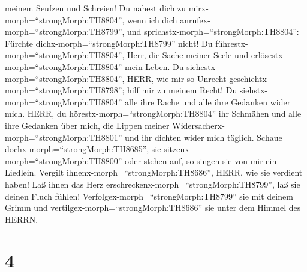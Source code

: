 meinem Seufzen und Schreien!  Du nahest dich zu
mirx-morph=``strongMorph:TH8804'', wenn ich dich
anrufex-morph=``strongMorph:TH8799'', und
sprichstx-morph=``strongMorph:TH8804'': Fürchte
dichx-morph=``strongMorph:TH8799'' nicht!  Du
führestx-morph=``strongMorph:TH8804'', Herr, die Sache meiner Seele und
erlösestx-morph=``strongMorph:TH8804'' mein Leben.  Du
siehestx-morph=``strongMorph:TH8804'', HERR, wie mir so Unrecht
geschiehtx-morph=``strongMorph:TH8798''; hilf mir zu meinem Recht!
 Du siehstx-morph=``strongMorph:TH8804'' alle ihre Rache
und alle ihre Gedanken wider mich.  HERR, du
hörestx-morph=``strongMorph:TH8804'' ihr Schmähen und alle ihre Gedanken
über mich,  die Lippen meiner
Widersacherx-morph=``strongMorph:TH8801'' und ihr dichten wider mich
täglich.  Schaue dochx-morph=``strongMorph:TH8685'', sie
sitzenx-morph=``strongMorph:TH8800'' oder stehen auf, so singen sie von
mir ein Liedlein.  Vergilt
ihnenx-morph=``strongMorph:TH8686'', HERR, wie sie verdient haben!
 Laß ihnen das Herz
erschreckenx-morph=``strongMorph:TH8799'', laß sie deinen Fluch fühlen!
 Verfolgex-morph=``strongMorph:TH8799'' sie mit deinem
Grimm und vertilgex-morph=``strongMorph:TH8686'' sie unter dem Himmel
des HERRN.

\hypertarget{section-3}{%
\section{4}\label{section-3}}

